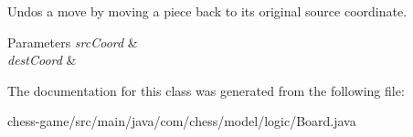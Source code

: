 Undos a move by moving a piece back to its original source coordinate. 
\begin{DoxyParams}{Parameters}
{\em src\+Coord} & \\
\hline
{\em dest\+Coord} & \\
\hline
\end{DoxyParams}


The documentation for this class was generated from the following file\+:\begin{DoxyCompactItemize}
\item 
chess-\/game/src/main/java/com/chess/model/logic/Board.\+java\end{DoxyCompactItemize}
